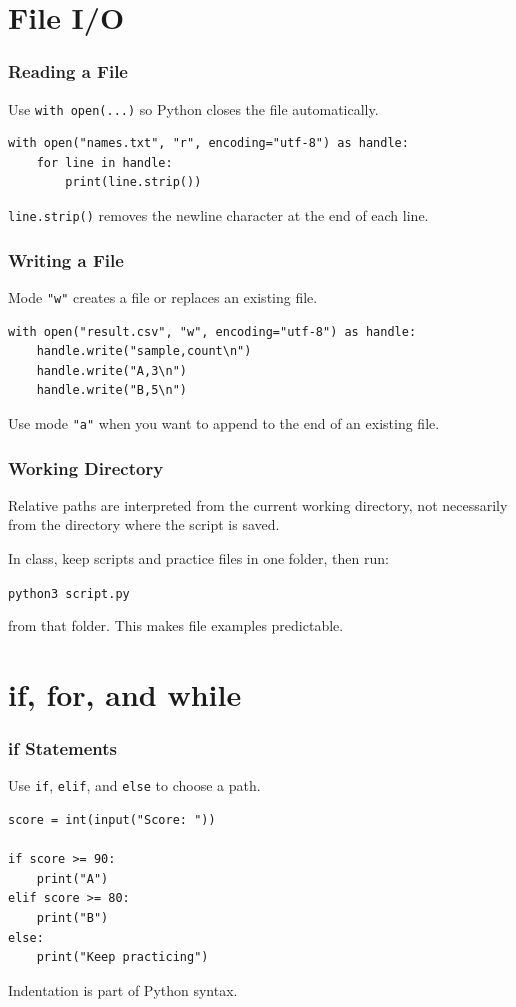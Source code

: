 \documentclass{beamer}
\begin{document}
	\section{File I/O}
	\begin{frame}[fragile]
		\frametitle{Reading a File}

		Use \texttt{with open(...)} so Python closes the file automatically.
		\begin{lstlisting}
with open("names.txt", "r", encoding="utf-8") as handle:
    for line in handle:
        print(line.strip())
		\end{lstlisting}

		\texttt{line.strip()} removes the newline character at the end of each
		line.
	\end{frame}

	\begin{frame}[fragile]
		\frametitle{Writing a File}

		Mode \texttt{"w"} creates a file or replaces an existing file.
		\begin{lstlisting}
with open("result.csv", "w", encoding="utf-8") as handle:
    handle.write("sample,count\n")
    handle.write("A,3\n")
    handle.write("B,5\n")
		\end{lstlisting}

		Use mode \texttt{"a"} when you want to append to the end of an existing
		file.
	\end{frame}

	\begin{frame}
		\frametitle{Working Directory}

		Relative paths are interpreted from the current working directory, not
		necessarily from the directory where the script is saved.

		\medskip

		In class, keep scripts and practice files in one folder, then run:
		\begin{example}
			\texttt{python3 script.py}
		\end{example}

		from that folder. This makes file examples predictable.
	\end{frame}

	\section{if, for, and while}
	\begin{frame}[fragile]
		\frametitle{if Statements}

		Use \texttt{if}, \texttt{elif}, and \texttt{else} to choose a path.
		\begin{lstlisting}
score = int(input("Score: "))

if score >= 90:
    print("A")
elif score >= 80:
    print("B")
else:
    print("Keep practicing")
		\end{lstlisting}

		Indentation is part of Python syntax.
	\end{frame}
\end{document}
